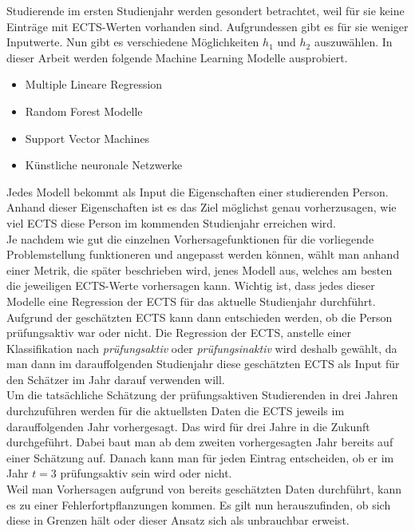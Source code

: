 Studierende im ersten Studienjahr werden gesondert betrachtet, weil f\"ur sie keine Eintr\"age mit ECTS-Werten vorhanden sind.
Aufgrundessen gibt es f\"ur sie weniger Inputwerte.
Nun gibt es verschiedene M\"oglichkeiten $h_1$ und $h_2$ auszuwählen. In dieser Arbeit
werden folgende Machine Learning Modelle ausprobiert.

\begin{itemize}
  \item Multiple Lineare Regression
  \item Random Forest Modelle
  \item Support Vector Machines
  \item K\"unstliche neuronale Netzwerke
\end{itemize}

Jedes Modell bekommt als Input die Eigenschaften einer studierenden Person. Anhand dieser Eigenschaften ist es das Ziel m\"oglichst genau
vorherzusagen, wie viel ECTS diese Person im kommenden Studienjahr erreichen wird. \\

Je nachdem wie gut die einzelnen Vorhersagefunktionen für die vorliegende Problemstellung funktioneren
und angepasst werden können, w\"ahlt man anhand einer Metrik, die sp\"ater beschrieben wird, jenes Modell aus, welches
am besten die jeweiligen ECTS-Werte vorhersagen kann.
Wichtig ist, dass jedes dieser Modelle eine Regression der ECTS f\"ur das aktuelle Studienjahr
durchf\"uhrt. Aufgrund der gesch\"atzten ECTS kann dann entschieden werden, ob die Person
pr\"ufungsaktiv war oder nicht. Die Regression der ECTS, anstelle einer Klassifikation nach
\textit{pr\"ufungsaktiv} oder \textit{pr\"ufungsinaktiv} wird deshalb gew\"ahlt, da man dann im darauffolgenden Studienjahr diese
gesch\"atzten ECTS als Input f\"ur den Sch\"atzer im Jahr darauf verwenden will.\\


Um die tats\"achliche Sch\"atzung der pr\"ufungsaktiven Studierenden in drei Jahren durchzuf\"uhren werden f\"ur die
aktuellsten Daten die ECTS jeweils im darauffolgenden Jahr vorhergesagt. Das wird f\"ur drei Jahre in die Zukunft durchgef\"uhrt.
Dabei baut man ab dem zweiten vorhergesagten Jahr
bereits auf einer Sch\"atzung auf. Danach kann man f\"ur jeden Eintrag entscheiden, ob er im Jahr $t = 3$ pr\"ufungsaktiv sein wird oder nicht. \\

Weil man Vorhersagen aufgrund von bereits gesch\"atzten Daten durchf\"uhrt, kann es zu einer Fehlerfortpflanzungen kommen.
Es gilt nun herauszufinden, ob sich diese in Grenzen h\"alt oder dieser Ansatz sich als unbrauchbar erweist. \\





